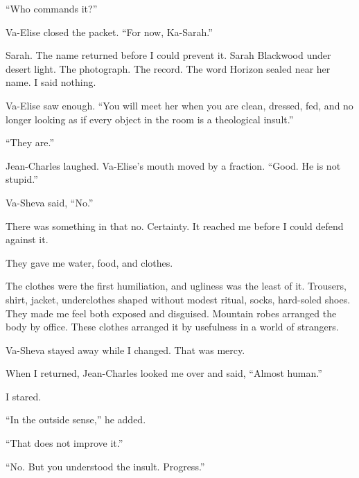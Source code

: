 ``Who commands it?''\par

Va-Elise closed the packet. ``For now, Ka-Sarah.''\par

Sarah. The name returned before I could prevent it. Sarah Blackwood under desert light. The photograph. The record. The word Horizon sealed near her name. I said nothing.\par

Va-Elise saw enough. ``You will meet her when you are clean, dressed, fed, and no longer looking as if every object in the room is a theological insult.''\par

``They are.''\par

Jean-Charles laughed. Va-Elise's mouth moved by a fraction. ``Good. He is not stupid.''\par

Va-Sheva said, ``No.''\par

There was something in that no. Certainty. It reached me before I could defend against it.\par

\ornament

They gave me water, food, and clothes.\par

The clothes were the first humiliation, and ugliness was the least of it. Trousers, shirt, jacket, underclothes shaped without modest ritual, socks, hard-soled shoes. They made me feel both exposed and disguised. Mountain robes arranged the body by office. These clothes arranged it by usefulness in a world of strangers.\par

Va-Sheva stayed away while I changed. That was mercy.\par

When I returned, Jean-Charles looked me over and said, ``Almost human.''\par

I stared.\par

``In the outside sense,'' he added.\par

``That does not improve it.''\par

``No. But you understood the insult. Progress.''\par

